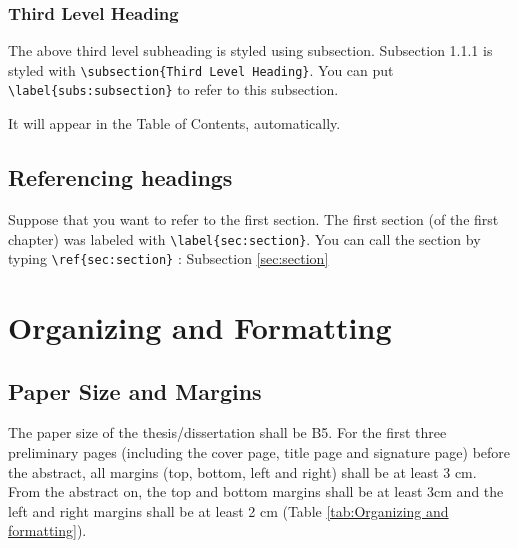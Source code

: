 \documentclass[11pt]{report}
\theoremstyle{plain}
\theoremstyle{definition}
\theoremstyle{corollary}
\theoremstyle{definition}
\theoremstyle{plain}
\theoremstyle{definition}
\theoremstyle{plain}
\begin{document}
%
\subsection{Third Level Heading}\label{subs:subsection}
The above third level subheading is styled using subsection.
Subsection 1.1.1 is styled with \verb|\subsection{Third Level Heading}|.
You can put \\\verb|\label{subs:subsection}| to refer to this subsection.

It will appear in the Table of Contents, automatically.

%
\section{Referencing headings}\label{sec:referencing}
Suppose that you want to refer to the first section.
The first section (of the first chapter) was labeled with \verb|\label{sec:section}|.
You can call the section by typing \verb|\ref{sec:section}| : Subsection \ref{sec:section}

\chapter{Organizing and Formatting}\label{chap:organizing}

\section{Paper Size and Margins} \label{sec:papersize}
The paper size of the thesis/dissertation shall be B5.
For the first three preliminary pages (including the cover page, title page and signature page) before the abstract, all margins (top, bottom, left and right) shall be at least 3 cm.
From the abstract on, the top and bottom margins shall be at least 3cm and the left and right margins shall be at least 2 cm (Table \ref{tab:Organizing and formatting}).
\end{document}
